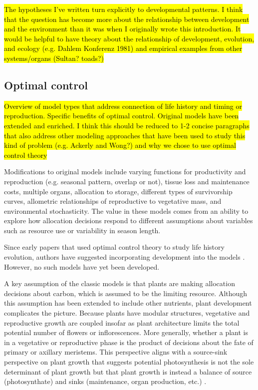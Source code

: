 \documentclass[12pt, oneside]{article}   	%
\begin{document}
\hl{The hypotheses I've written turn explicitly to developmental patterns. I think that the question has become more about the relationship between development and the environment than it was when I originally wrote this introduction. It would be helpful to have theory about the relationship of development, evolution, and ecology (e.g. Dahlem Konferenz 1981) and empirical examples from other systems/organs (Sultan? toads?)}

\subsection{Optimal control}

\hl{Overview of model types that address connection of life history and timing or reproduction. Specific benefits of optimal control. Original models have been extended and enriched. I think this should be reduced to 1-2 concise paragraphs that also address other modeling approaches that have been used to study this kind of problem (e.g. Ackerly and Wong?) and why we chose to use optimal control theory}

Modifications to original models include varying functions for productivity and reproduction (e.g. seasonal pattern, overlap or not), tissue loss and maintenance costs, multiple organs, allocation to storage, different types of survivorship curves, allometric relationships of reproductive to vegetative mass, and environmental stochasticity. The value in these models comes from an ability to explore how allocation decisions respond to different assumptions about variables such as resource use or variability in season length. 

Since early papers that used optimal control theory to study life history evolution, authors have suggested incorporating development into the models \cite{cohen1971,schaffer1982,fox199b}. However, no such models have yet been developed. 

A key assumption of the classic models is that plants are making allocation decisions about carbon, which is assumed to be the limiting resource. Although this assumption has been extended to include other nutrients, plant development complicates the picture. Because plants have modular structures, vegetative and reproductive growth are coupled insofar as plant architecture limits the total potential number of flowers or inflorescences. More generally, whether a plant is in a vegetative or reproductive phase is the product of decisions about the fate of primary or axillary meristems. This perspective aligns with a source-sink perspective on plant growth that suggests potential photosynthesis is not the sole determinant of plant growth but that plant growth is instead a balance of source (photosynthate) and sinks (maintenance, organ production, etc.) \cite{korner2015,rees2016}.
\end{document}

